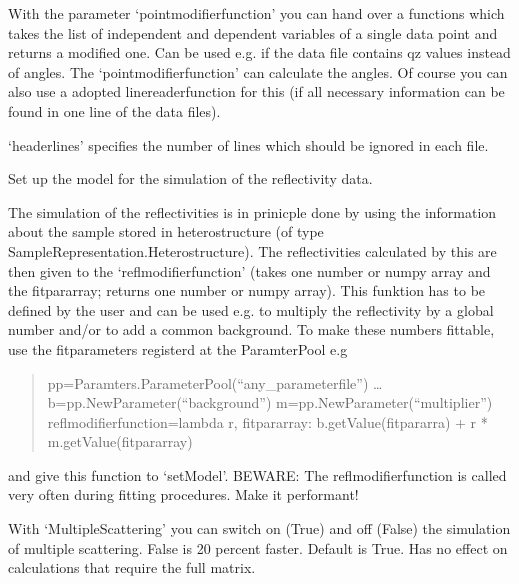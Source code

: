 \documentclass[letterpaper,10pt,english]{sphinxmanual}
\begin{document}
\begin{fulllineitems}
\begin{fulllineitems}
With the parameter ‘pointmodifierfunction’ you can hand over a functions which takes the list of independent and dependent variables of a single data point and returns a modified one.
Can be used e.g. if the data file contains qz values instead of angles. The ‘pointmodifierfunction’ can calculate the angles.
Of course you can also use a adopted linereaderfunction for this (if all necessary information can be found in one line of the data files).

‘headerlines’ specifies the number of lines which should be ignored in each file.

\end{fulllineitems}


\begin{fulllineitems}
\label{\detokenize{modules-api/experiment:Experiment.ReflDataSimulator.setModel}}
Set up the model for the simulation of the reflectivity data.

The simulation of the reflectivities is in prinicple done by using the information about the sample stored in heterostructure (of type SampleRepresentation.Heterostructure).
The reflectivities calculated by this are then given to the ‘reflmodifierfunction’ (takes one number or numpy array and the fitpararray; returns one number or numpy array). This funktion has to be defined 
by the user and can be used e.g. to multiply the reflectivity by a global number and/or to add a common background. To make these numbers fittable, use the fitparameters registerd at the ParamterPool
e.g
\begin{quote}

pp=Paramters.ParameterPool(“any\_parameterfile”)
…
b=pp.NewParameter(“background”)
m=pp.NewParameter(“multiplier”)
reflmodifierfunction=lambda r, fitpararray: b.getValue(fitpararra) + r * m.getValue(fitpararray)
\end{quote}

and give this function to ‘setModel’.
BEWARE: The reflmodifierfunction is called very often during fitting procedures. Make it performant!

With ‘MultipleScattering’ you can switch on (True) and off (False) the simulation of multiple scattering. False is 20 percent faster. Default is True. Has no effect on calculations that require the full matrix.


\end{fulllineitems}
\end{fulllineitems}
\end{document}
